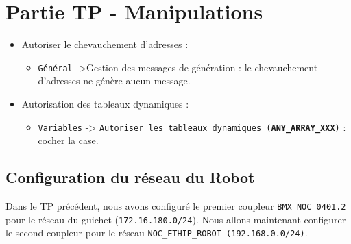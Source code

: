 
\section{Partie TP - Manipulations}


\begin{UPSTIVerification}
\end{UPSTIVerification}

\begin{UPSTIConfiguration}
    \begin{itemize}
        \item Autoriser le chevauchement d'adresses : 
        \begin{itemize}
            \item \texttt{Général} ->Gestion des messages de génération : le chevauchement d’adresses ne génère
            aucun message.
        \end{itemize}
        \item Autorisation des tableaux dynamiques : 
        \begin{itemize}
            \item \texttt{Variables} -> \texttt{Autoriser les tableaux dynamiques (\textbf{ANY\_ARRAY\_XXX})} : cocher la case.
            \end{itemize}
    \end{itemize}
\end{UPSTIConfiguration}



\subsection{Configuration du réseau du Robot}

Dans le TP précédent, nous avons configuré le premier coupleur \texttt{BMX NOC 0401.2} pour le réseau du guichet (\texttt{172.16.180.0/24}). Nous allons maintenant configurer le second coupleur pour le réseau \texttt{NOC\_ETHIP\_ROBOT (192.168.0.0/24)}.

